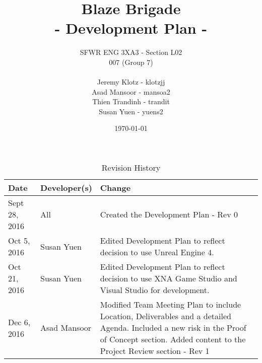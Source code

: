 \documentclass{article}
\title{ \vspace{40mm}
	\textbf {
	\Huge {\color[rgb]{0.9,0,0}Blaze} Brigade \\
	\large - Development Plan -}}
\date{\today}
\author{SFWR ENG 3XA3 - Section L02 \\
	007 (Group 7) \\ \\
	Jeremy Klotz - klotzjj \\
	Asad Mansoor - mansoa2 \\
	Thien Trandinh - trandit \\
	Susan Yuen - yuens2}
\begin{document}
\newpage
\maketitle
{}
\newpage

\begin{table}[hp]
    \begin{tabularx}{\textwidth}{llX}
        \toprule
        \textbf{Date} & \textbf{Developer(s)} & \textbf{Change}\\
        \midrule
        Sept 28, 2016 & All & Created the Development Plan - Rev 0 \\
        Oct 5, 2016 & Susan Yuen & Edited Development Plan to reflect decision to use Unreal Engine 4. \\
        Oct 21, 2016 & Susan Yuen & Edited Development Plan to reflect decision to use XNA Game Studio and Visual Studio for development. \\
        Dec 6, 2016 & Asad Mansoor & Modified Team Meeting Plan to include Location, Deliverables and a detailed Agenda. Included a new risk in the Proof of Concept section. Added content to the Project Review section - Rev 1  \\
        \bottomrule
    \end{tabularx}
    \caption{Revision History} \label{TblRevisionHistory}
\end{table}

\newpage
{}
\end{document}
